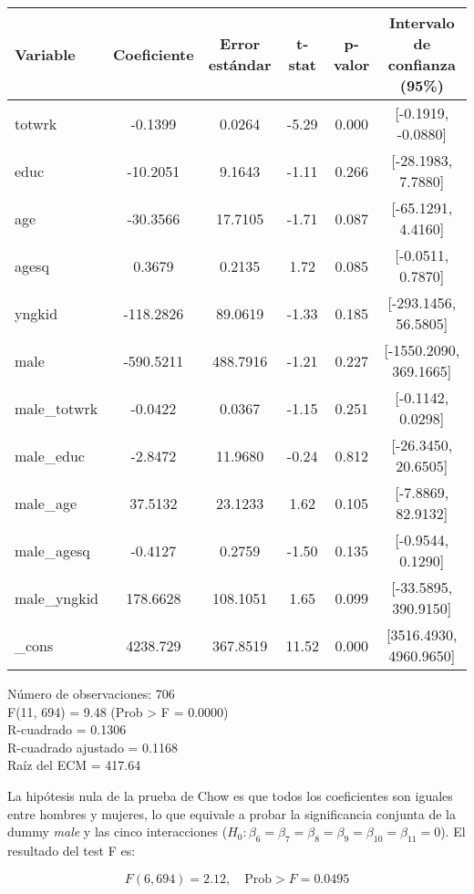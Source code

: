 \documentclass[12pt]{article}
\begin{document}
\begin{center}
\begin{tabular}{l c c c c c}
\toprule
Variable & Coeficiente & Error estándar & t-stat & p-valor & Intervalo de confianza (95\%) \\
\midrule
totwrk & -0.1399 & 0.0264 & -5.29 & 0.000 & [-0.1919, -0.0880] \\
educ & -10.2051 & 9.1643 & -1.11 & 0.266 & [-28.1983, 7.7880] \\
age & -30.3566 & 17.7105 & -1.71 & 0.087 & [-65.1291, 4.4160] \\
agesq & 0.3679 & 0.2135 & 1.72 & 0.085 & [-0.0511, 0.7870] \\
yngkid & -118.2826 & 89.0619 & -1.33 & 0.185 & [-293.1456, 56.5805] \\
male & -590.5211 & 488.7916 & -1.21 & 0.227 & [-1550.2090, 369.1665] \\
male\_totwrk & -0.0422 & 0.0367 & -1.15 & 0.251 & [-0.1142, 0.0298] \\
male\_educ & -2.8472 & 11.9680 & -0.24 & 0.812 & [-26.3450, 20.6505] \\
male\_age & 37.5132 & 23.1233 & 1.62 & 0.105 & [-7.8869, 82.9132] \\
male\_agesq & -0.4127 & 0.2759 & -1.50 & 0.135 & [-0.9544, 0.1290] \\
male\_yngkid & 178.6628 & 108.1051 & 1.65 & 0.099 & [-33.5895, 390.9150] \\
\_cons & 4238.729 & 367.8519 & 11.52 & 0.000 & [3516.4930, 4960.9650] \\
\bottomrule
\end{tabular}
\end{center}

Número de observaciones: 706 \\
F(11, 694) = 9.48 (Prob > F = 0.0000) \\
R-cuadrado = 0.1306 \\
R-cuadrado ajustado = 0.1168 \\
Raíz del ECM = 417.64

La hipótesis nula de la prueba de Chow es que todos los coeficientes son iguales entre hombres y mujeres, lo que equivale a probar la significancia conjunta de la dummy \textit{male} y las cinco interacciones (\( H_0: \beta_6 = \beta_7 = \beta_8 = \beta_9 = \beta_{10} = \beta_{11} = 0 \)). El resultado del test F es:

\[
F(6, 694) = 2.12, \quad \text{Prob} > F = 0.0495
\]
\end{document}
